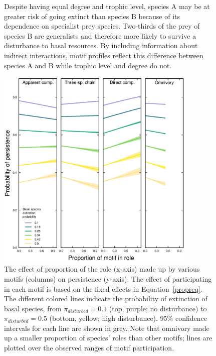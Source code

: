 \documentclass[12pt]{article}
\begin{document}
\begin{spacing}{2.0}
\begin{figure}[hb!]
{        Despite having equal degree and trophic level, species A may be at greater risk of going extinct than species B because of its dependence on specialist prey species. Two-thirds of the prey of species B are generalists and therefore more likely to survive a disturbance to basal resources. By including information about indirect interactions, motif profiles reflect this difference between species A and B while trophic level and degree do not.}
    \label{fig:concept}
    \end{figure}

        \begin{figure}[hb!]
        \centering
        \includegraphics[width=0.85\textwidth]{figures/persistence_motif_participation.eps}
        \caption{The effect of proportion of the role (x-axis) made up by various motifs (columns) on persistence (y-axis). The effect of participating in each motif is based on the fixed effects in Equation~\ref{propreq}. The different colored lines indicate the probability of extinction of basal species, from $\pi_{disturbed} = 0.1$ (top, purple; no disturbance) to $\pi_{disturbed} = 0.5$ (bottom, yellow; high disturbance). 95\% confidence intervals for each line are shown in grey. Note that omnivory made up a smaller proportion of species' roles than other motifs; lines are plotted over the observed ranges of motif participation.}
    \label{fig:prop_lmer_all}
    \end{figure}
        

\end{spacing}
\end{document}
